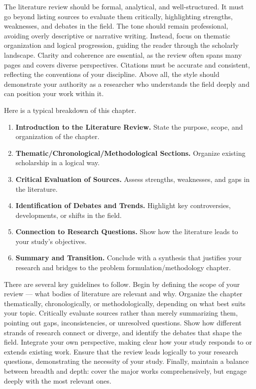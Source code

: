 \documentclass[PCOM,Thesis,Review]{mpThesis}
\newcommand{\Hd}[1]{{\color{SteelBlue}\bf#1.}}
\begin{document}
\begin{MainMatter}
\begin{Remark}
The literature review should be formal, analytical, and well-structured.
It must go beyond listing sources to evaluate them critically, highlighting strengths, weaknesses, and debates in the field.
The tone should remain professional, avoiding overly descriptive or narrative writing.
Instead, focus on thematic organization and logical progression, guiding the reader through the scholarly landscape.
Clarity and coherence are essential, as the review often spans many pages and covers diverse perspectives.
Citations must be accurate and consistent, reflecting the conventions of your discipline.
Above all, the style should demonstrate your authority as a researcher who understands the field deeply and can position your work within it.

Here is a typical breakdown of this chapter.
\begin{enumerate}
\item \Hd{Introduction to the Literature Review}
State the purpose, scope, and organization of the chapter.

\item \Hd{Thematic/Chronological/Methodological Sections}
Organize existing scholarship in a logical way.

\item \Hd{Critical Evaluation of Sources}
Assess strengths, weaknesses, and gaps in the literature.

\item \Hd{Identification of Debates and Trends}
Highlight key controversies, developments, or shifts in the field.

\item \Hd{Connection to Research Questions}
Show how the literature leads to your study's objectives.

\item \Hd{Summary and Transition}
Conclude with a synthesis that justifies your research and bridges to the problem formulation/methodology chapter.
\end{enumerate}

There are several key guidelines to follow.
Begin by defining the scope of your review --- what bodies of literature are relevant and why.
Organize the chapter thematically, chronologically, or methodologically, depending on what best suits your topic.
Critically evaluate sources rather than merely summarizing them, pointing out gaps, inconsistencies, or unresolved questions.
Show how different strands of research connect or diverge, and identify the debates that shape the field.
Integrate your own perspective, making clear how your study responds to or extends existing work.
Ensure that the review leads logically to your research questions, demonstrating the necessity of your study.
Finally, maintain a balance between breadth and depth: cover the major works comprehensively, but engage deeply with the most relevant ones.
\end{Remark}


\end{MainMatter}
\end{document}
